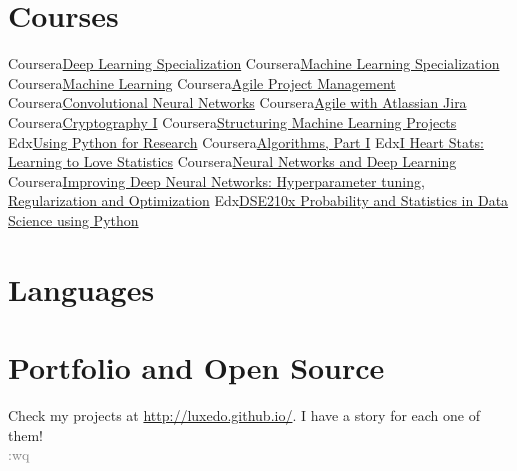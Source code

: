 \documentclass[11pt,a4paper,sans]{moderncv}        %
\begin{document}
\section{Courses}
\cvdoubleitem
{Coursera}{\href{https://www.coursera.org/account/accomplishments/specialization/certificate/Q3RT6P3BF5XU}{Deep Learning Specialization}}
{Coursera}{\href{https://www.coursera.org/account/accomplishments/specialization/YHKBDQ77K2GB}{Machine Learning Specialization}}
\cvdoubleitem
{Coursera}{\href{https://www.coursera.org/account/accomplishments/verify/CWFKK68KQP9X}{\small{Machine Learning}}}
{Coursera}{\href{https://www.coursera.org/api/legacyCertificates.v1/spark/statementOfAccomplishment/976353~15102768/pdf}{\small{Agile Project Management}}}
\cvdoubleitem
{Coursera}{\href{https://www.coursera.org/account/accomplishments/verify/5A8K3WTQHAZF}{\small{Convolutional Neural Networks}}}
{Coursera}{\href{https://www.coursera.org/account/accomplishments/certificate/ZTZR93WKX3JV}{\small{Agile with Atlassian Jira}}}
\cvdoubleitem
{Coursera}{\href{https://www.coursera.org/api/legacyCertificates.v1/spark/statementOfAccomplishment/976353~15102768/pdf}{\small{Cryptography I}}}
{Coursera}{\href{https://www.coursera.org/account/accomplishments/verify/BBTE8KJC6WRU}{\footnotesize{Structuring Machine Learning Projects}}}
\cvdoubleitem
{Edx}{\href{https://www.edx.org/course/using-python-for-research}{\small{Using Python for Research}}}
{Coursera}{\href{https://www.coursera.org/learn/algorithms-part1}{\small{Algorithms, Part I}}}
\cvdoubleitem
{Edx}{\href{https://www.edx.org/course/i-heart-stats-learning-love-statistics-notredamex-soc120x}{\scriptsize{I Heart Stats: Learning to Love Statistics}}}
{Coursera}{\href{https://www.coursera.org/account/accomplishments/verify/RY4DLN2Q6MW3}{\footnotesize{Neural Networks and Deep Learning}}}
\cvdoubleitem
{Coursera}{\href{https://www.coursera.org/account/accomplishments/verify/6SEWP83D96QM}{\scriptsize{Improving Deep Neural Networks: Hyperparameter tuning, Regularization and Optimization}}}
{Edx}{\href{https://www.edx.org/course/probability-and-statistics-in-data-science-using-python}{\scriptsize{DSE210x Probability and Statistics in Data Science using Python}}}

\section{Languages}


\section{Portfolio and Open Source}
Check my projects at \url{http://luxedo.github.io/}. I have a story for each one of them!\\
\textcolor{gray}{:wq}

\clearpage
\end{document}
